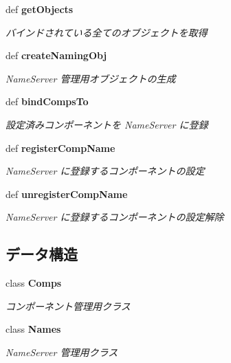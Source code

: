 \begin{CompactItemize}
def {\bf getObjects}
\begin{CompactList}\small\item\em バインドされている全てのオブジェクトを取得 \item\end{CompactList}\item 
def {\bf createNamingObj}
\begin{CompactList}\small\item\em NameServer 管理用オブジェクトの生成 \item\end{CompactList}\item 
def {\bf bindCompsTo}
\begin{CompactList}\small\item\em 設定済みコンポーネントを NameServer に登録 \item\end{CompactList}\item 
def {\bf registerCompName}
\begin{CompactList}\small\item\em NameServer に登録するコンポーネントの設定 \item\end{CompactList}\item 
def {\bf unregisterCompName}
\begin{CompactList}\small\item\em NameServer に登録するコンポーネントの設定解除 \item\end{CompactList}\end{CompactItemize}
\subsection*{データ構造}
\begin{CompactItemize}
\item 
class {\bf Comps}
\begin{CompactList}\small\item\em コンポーネント管理用クラス \item\end{CompactList}\item 
class {\bf Names}
\begin{CompactList}\small\item\em NameServer 管理用クラス \item\end{CompactList}\end{CompactItemize}


